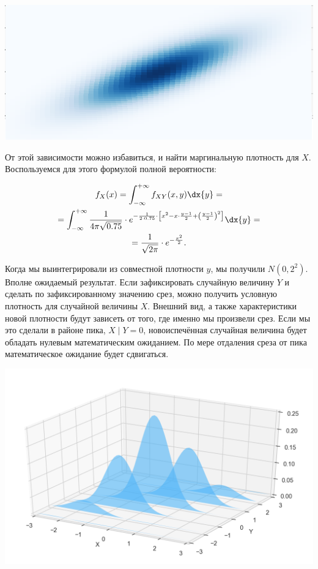 \documentclass[12pt, a4paper, oneside]{article}
\begin{document}
\begin{center}
\includegraphics[scale=0.25]{two_normal_2.png}
\end{center}

От этой зависимости можно избавиться, и найти маргинальную плотность для $X$. Воспользуемся для этого формулой полной вероятности: 

\begin{multline*}
f_X(x) = \int_{-\infty}^{+\infty} f_{XY}(x,y) \dx{y} = \\ = \int_{-\infty}^{+\infty} \frac{1}{4 \pi \sqrt{0.75}} \cdot e^{-\frac{1}{2 \cdot 0.75} \cdot \left[ x^2 - x \cdot \frac{y - 1}{2} + \left( \frac{y - 1}{2}    \right)^2   \right]} \dx{y}  = \\ = \frac{1}{\sqrt{2 \pi} }\cdot e^{-\frac{x^2}{2}}.
\end{multline*}

Когда мы выинтегрировали из совместной плотности $y$, мы получили $N(0, 2^2)$. Вполне ожидаемый результат.  Если зафиксировать случайную величину $Y$ и сделать по зафиксированному значению срез, можно получить условную плотность для случайной величины $X$.  Внешний вид, а также характеристики новой плотности  будут зависеть от того, где именно мы произвели срез. Если мы это сделали в районе пика, $X \mid Y=0$,  новоиспечённая случайная величина будет обладать нулевым математическим ожиданием. По мере отдаления среза от пика математическое ожидание будет сдвигаться. 

\begin{center}
	\includegraphics[scale=0.22]{two_normal_3.png}
\end{center}
\end{document}
